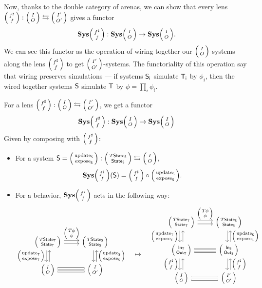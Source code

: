 \documentclass[DynamicalBook]{subfiles}
\begin{document}
Now, thanks to the double category of arenas, we can show that every lens
$\lens{f^{\sharp}}{f} : \lens{I}{O} \fromto \lens{I'}{O'}$ gives a functor 
  $$\Cat{Sys}\lens{f^\sharp}{f} : \Cat{Sys}\lens{I}{O} \to
  \Cat{Sys}\lens{I}{O}.$$
We can see this functor as the operation of wiring together our
$\lens{I}{O}$-systems along the lens $\lens{f^{\sharp}}{f}$ to get
$\lens{I'}{O'}$-systems. The functoriality of this operation say that wiring
preserves simulations --- if systems $\mathsf{S_i}$ simulate $\mathsf{T_i}$ by $\phi_i$,
then the wired together systems $\mathsf{S}$ simulate $\mathsf{T}$ by $\phi = \prod_i
\phi_i$. 

\begin{proposition}\label{prop.lens_comp_functor_discrete}
  For a lens $\lens{f^{\sharp}}{f} : \lens{I}{O} \leftrightarrows
  \lens{I'}{O'}$, we get a functor
  $$\Cat{Sys}\lens{f^\sharp}{f} : \Cat{Sys}\lens{I}{O} \to
  \Cat{Sys}\lens{I}{O}$$
  Given by composing with $\lens{f^\sharp}{f}$:
  \begin{itemize}
    \item For a system $\Sys{S} = \lens{\update{S}}{\expose{S}} :
      \lens{T\State{S}}{\State{S}}\fromto \lens{I}{O}$,
      $$\Cat{Sys}\lens{f^{\sharp}}{f}(\Sys{S}) = \lens{f^{\sharp}}{f} \circ \lens{\update{S}}{\expose{S}}.$$
    \item For a behavior, $\Cat{Sys}\lens{f^{\sharp}}{f}$ acts in the following way:
      \[
  \begin{tikzcd}
    \lens{T\State{T}}{\State{T}} \ar[r, shift left, "\lens{T\phi}{\phi}"] \ar[r, shift right] \ar[d, shift right,
    "\lens{\update{T}}{\expose{T}}"'] \ar[d, shift left, leftarrow] &
    \lens{T\State{S}}{\State{S}} \ar[d, shift left, leftarrow,
    "\lens{\update{S}}{\expose{S}}"] \ar[d, shift right]\\
    \lens{I}{O} \ar[r, shift right, equals]
    \ar[r, shift left, equals] & \lens{I}{O'}
  \end{tikzcd} \quad \mapsto \quad
  \begin{tikzcd}
    \lens{T\State{T}}{\State{T}} \ar[r, shift left, "\lens{T\phi}{\phi}"] \ar[r, shift right] \ar[d, shift right,
    "\lens{\update{T}}{\expose{T}}"'] \ar[d, shift left, leftarrow] &
    \lens{T\State{S}}{\State{S}} \ar[d, shift left, leftarrow,
    "\lens{\update{S}}{\expose{S}}"] \ar[d, shift right]\\
    \lens{\In{T}}{\Out{T}} \ar[d, shift right, "\lens{f^{\sharp}}{f}"'] \ar[d, shift left,
        leftarrow] \ar[r, shift right, equals]
    \ar[r, shift left, equals] & \lens{\In{S}}{\Out{S}} \ar[d, shift left, leftarrow,
        "\lens{f^{\sharp}}{f}"] \ar[d, shift right]\\
    \lens{I}{O} \ar[r, shift right, equals]
    \ar[r, shift left, equals] & \lens{I'}{O'} \\
  \end{tikzcd} 
      \]
  \end{itemize}
\end{proposition}
\end{document}
